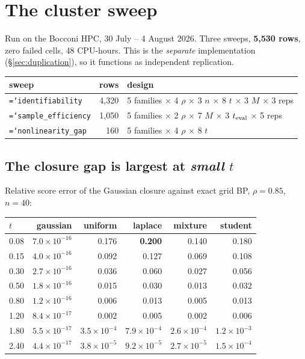 \documentclass[11pt,a4paper]{article}
\newcommand{\code}[1]{\texttt{\small\hyphenchar\font=`\-\relax #1}}
\begin{document}
\newpage
\section{The cluster sweep}
\label{sec:cluster}

Run on the Bocconi HPC, 30 July -- 4 August 2026. Three sweeps, \textbf{5{,}530 rows}, zero
failed cells, 48 CPU-hours. This is the \emph{separate} implementation
(\S\ref{sec:duplication}), so it functions as independent replication.

\begin{center}
\begin{tabular}{@{}lrl@{}}
\toprule
sweep & rows & design \\
\midrule
\code{identifiability} & 4{,}320 & 5 families $\times$ 4 $\rho$ $\times$ 3 $n$ $\times$ 8 $t$ $\times$ 3 $M$ $\times$ 3 reps \\
\code{sample\_efficiency} & 1{,}050 & 5 families $\times$ 2 $\rho$ $\times$ 7 $M$ $\times$ 3 $t_{\rm eval}$ $\times$ 5 reps \\
\code{nonlinearity\_gap} & 160 & 5 families $\times$ 4 $\rho$ $\times$ 8 $t$ \\
\bottomrule
\end{tabular}
\end{center}

\subsection{The closure gap is largest at \emph{small} $t$}

Relative score error of the Gaussian closure against exact grid BP, $\rho=0.85$, $n=40$:

\begin{center}
\begin{tabular}{@{}lrrrrr@{}}
\toprule
$t$ & gaussian & uniform & laplace & mixture & student \\
\midrule
0.08 & $7.0\times10^{-16}$ & 0.176 & \textbf{0.200} & 0.140 & 0.180 \\
0.15 & $4.0\times10^{-16}$ & 0.092 & 0.127 & 0.069 & 0.108 \\
0.30 & $2.7\times10^{-16}$ & 0.036 & 0.060 & 0.027 & 0.056 \\
0.50 & $1.8\times10^{-16}$ & 0.015 & 0.030 & 0.013 & 0.032 \\
0.80 & $1.2\times10^{-16}$ & 0.006 & 0.013 & 0.005 & 0.013 \\
1.20 & $8.4\times10^{-17}$ & 0.002 & 0.005 & 0.002 & 0.006 \\
1.80 & $5.5\times10^{-17}$ & $3.5\times10^{-4}$ & $7.9\times10^{-4}$ & $2.6\times10^{-4}$ & $1.2\times10^{-3}$ \\
2.40 & $4.4\times10^{-17}$ & $3.8\times10^{-5}$ & $9.2\times10^{-5}$ & $2.7\times10^{-5}$ & $1.5\times10^{-4}$ \\
\bottomrule
\end{tabular}
\end{center}
\end{document}
